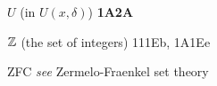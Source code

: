 \indexmedskip
{}

$U$ (in $U(x,\delta)$) {\bf 1A2A}

































\indexmedskip
{}

$\Bbb Z$ (the set of integers) 111Eb, 1A1Ee







ZFC {\it see} Zermelo-Fraenkel set theory

 



 






 













































\indexmedskip
\indexheader{$\scriptstyle\pmb{\pi}$}







